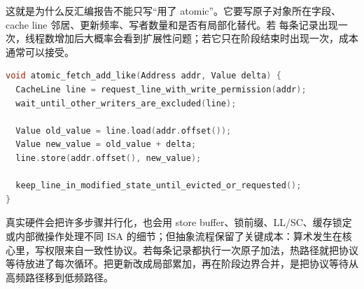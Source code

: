 这就是为什么反汇编报告不能只写“用了 atomic”。它要写原子对象所在字段、cache line 邻居、更新频率、写者数量和是否有局部化替代。若  每条记录出现一次，线程数增加后大概率会看到扩展性问题；若它只在阶段结束时出现一次，成本通常可以接受。

\begin{lstlisting}[language=C++,caption={原子读改写写的抽象硬件流程}]
void atomic_fetch_add_like(Address addr, Value delta) {
  CacheLine line = request_line_with_write_permission(addr);
  wait_until_other_writers_are_excluded(line);

  Value old_value = line.load(addr.offset());
  Value new_value = old_value + delta;
  line.store(addr.offset(), new_value);

  keep_line_in_modified_state_until_evicted_or_requested();
}
\end{lstlisting}

真实硬件会把许多步骤并行化，也会用 store buffer、锁前缀、LL/SC、缓存锁定或内部微操作处理不同 ISA 的细节；但抽象流程保留了关键成本：算术发生在核心里，写权限来自一致性协议。若每条记录都执行一次原子加法，热路径就把协议等待放进了每次循环。把更新改成局部累加，再在阶段边界合并，是把协议等待从高频路径移到低频路径。

